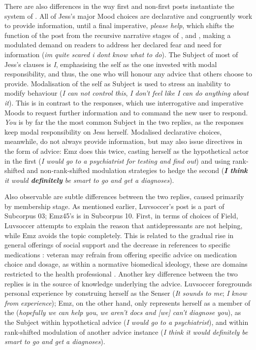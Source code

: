 There are also differences in the way first and non\hyp{}first \glspl{post} instantiate the system of . All of Jess's major Mood choices are declarative and congruently work to provide information, until a final imperative, \emph{please help}, which shifts the function of the \gls{post} from the recursive narrative stages of ,  and , making a modulated demand on readers to address her declared fear and need for information (\emph{im quite scared i dont know what to do}). The Subject of most of Jess's clauses is \emph{I}, emphasising the self as the one invested with modal responsibility, and thus, the one who will honour any advice that others choose to provide. Modalisation of the self as Subject is used to stress an inability to modify behaviour (\emph{I can not control this}, \emph{I don't feel like I can do anything about it}). This is in contrast to the responses, which use interrogative and imperative Moods to request further information and to command the new user to respond. \emph{You} is by far the the most common Subject in the two replies, as the responses keep modal responsibility on Jess herself. Modalised declarative choices, meanwhile, do not always provide information, but may also issue directives in the form of advice: Emz does this twice, casting herself as the hypothetical actor in the first (\emph{I would go to a psychiatrist for testing and find out}) and using rank\hyp{}shifted and non\hyp{}rank\hyp{}shifted modulation strategies to hedge the second (\emph{\textbf{I think} it would \textbf{definitely} be smart to go and get a diagnoses}).

Also observable are subtle differences between the two replies, caused primarily by membership stage. As mentioned earlier, Luvsoccer's \gls{post} is a part of Subcorpus 03; Emz45's is in Subcorpus 10. First, in terms of choices of Field, Luvsoccer attempts to explain the reason that antidepressants are not helping, while Emz avoids the topic completely. This is related to the gradual rise in general offerings of social support and the decrease in references to specific medications \cite{wang_stay_2012}: veteran  may refrain from offering specific advice on medication choice and dosage, as within a normative biomedical ideology, these are domains restricted to the health professional \cite{vayreda_social_2009}. Another key difference between the two replies is in the source of knowledge underlying the advice. Luvsoccer foregrounds personal experience by construing herself as the Senser (\emph{It sounds to me}; \emph{I know from experience}); Emz, on the other hand, only represents herself as a \gls{member} of the  (\emph{hopefully we can help you}, \emph{we aren't docs and [we] can't diagnose you}), as the Subject within hypothetical advice (\emph{I would go to a psychiatrist}), and within rank\hyp{}shifted modulation of another advice instance (\emph{I think it would definitely be smart to go and get a diagnoses}). 

